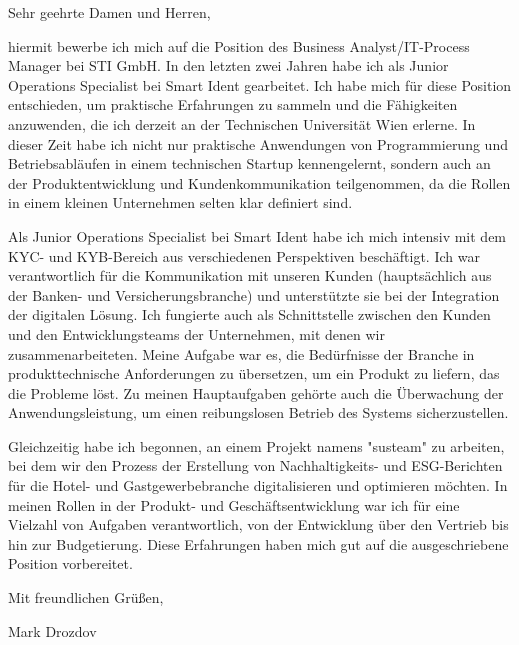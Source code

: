 \documentclass{ExpressiveCoverLetter}
\begin{document}
\coverletterheader[
    firstname=Mark,
    lastname=Drozdov,
    email=markdrozdov0@gmail.com,
    phone= +43-650-340-61-93,
    linkedin=mark-drozdov,
]

\vspace{0.10in}

Sehr geehrte Damen und Herren,

hiermit bewerbe ich mich auf die Position des Business Analyst/IT-Process Manager bei STI GmbH. In den letzten zwei Jahren habe ich als Junior Operations Specialist bei Smart Ident gearbeitet. Ich habe mich für diese Position entschieden, um praktische Erfahrungen zu sammeln und die Fähigkeiten anzuwenden, die ich derzeit an der Technischen Universität Wien erlerne. In dieser Zeit habe ich nicht nur praktische Anwendungen von Programmierung und Betriebsabläufen in einem technischen Startup kennengelernt, sondern auch an der Produktentwicklung und Kundenkommunikation teilgenommen, da die Rollen in einem kleinen Unternehmen selten klar definiert sind.

Als Junior Operations Specialist bei Smart Ident habe ich mich intensiv mit dem KYC- und KYB-Bereich aus verschiedenen Perspektiven beschäftigt. Ich war verantwortlich für die Kommunikation mit unseren Kunden (hauptsächlich aus der Banken- und Versicherungsbranche) und unterstützte sie bei der Integration der digitalen Lösung. Ich fungierte auch als Schnittstelle zwischen den Kunden und den Entwicklungsteams der Unternehmen, mit denen wir zusammenarbeiteten. Meine Aufgabe war es, die Bedürfnisse der Branche in produkttechnische Anforderungen zu übersetzen, um ein Produkt zu liefern, das die Probleme löst. Zu meinen Hauptaufgaben gehörte auch die Überwachung der Anwendungsleistung, um einen reibungslosen Betrieb des Systems sicherzustellen.

Gleichzeitig habe ich begonnen, an einem Projekt namens "susteam" zu arbeiten, bei dem wir den Prozess der Erstellung von Nachhaltigkeits- und ESG-Berichten für die Hotel- und Gastgewerbebranche digitalisieren und optimieren möchten. In meinen Rollen in der Produkt- und Geschäftsentwicklung war ich für eine Vielzahl von Aufgaben verantwortlich, von der Entwicklung über den Vertrieb bis hin zur Budgetierung. Diese Erfahrungen haben mich gut auf die ausgeschriebene Position vorbereitet.

Mit freundlichen Grüßen,

\vspace{0.05in}

Mark Drozdov
\end{document}
